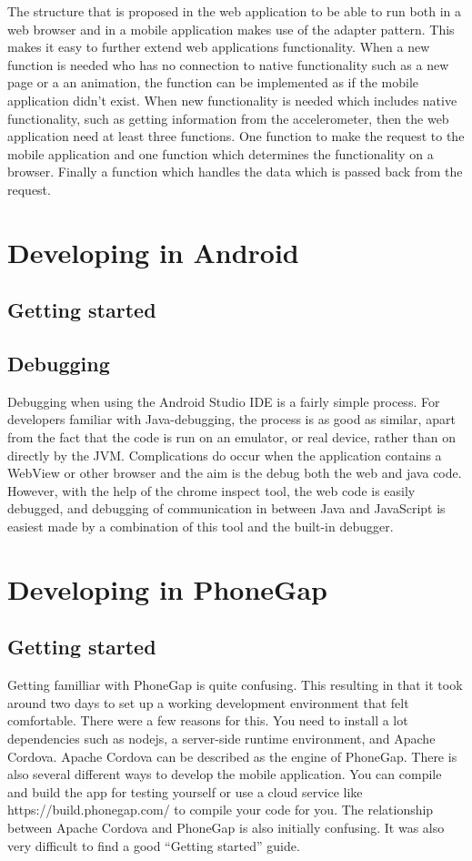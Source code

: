 The structure that is proposed in the web application to be able to run both in a web browser and in a mobile application makes use of the adapter pattern. This makes it easy to further extend web applications functionality. When a new function is needed who has no connection to native functionality such as a new page or a an animation, the function can be implemented as if the mobile application didn’t exist. When new functionality is needed which includes native functionality, such as getting information from the accelerometer, then the web application need at least three functions. One function to make the request to the mobile application and one function which determines the functionality on a browser. Finally a function which handles the data which is passed back from the request. 

\iffalse
\section{Developing in Android}
\subsection{Getting started}
\subsection{Debugging}
Debugging when using the Android Studio IDE is a fairly simple process. For developers familiar with Java-debugging, the process is as good as similar, apart from the fact that the code is run on an emulator, or real device, rather than on directly by the JVM. Complications do occur when the application contains a WebView or other browser and the aim is the debug both the web and java code. However, with the help of the chrome inspect tool, the web code is easily debugged, and debugging of communication in between Java and JavaScript is easiest made by a combination of this tool and the built-in debugger. 
\section{Developing in PhoneGap}
\subsection{Getting started}
Getting familliar with PhoneGap is quite confusing. This resulting in that it took around two days to set up a working development environment that felt comfortable. There were a few reasons for this. You need to install a lot dependencies such as nodejs, a server-side runtime environment, and Apache Cordova. Apache Cordova can be described as the engine of PhoneGap. There is also several different ways to develop the mobile application. You can compile and build the app for testing yourself or use a cloud service like https://build.phonegap.com/ to compile your code for you. The relationship between Apache Cordova and PhoneGap is also initially confusing. It was also very difficult to find a good “Getting started” guide.

